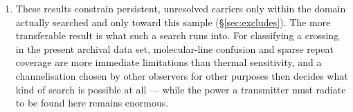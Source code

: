 \begin{enumerate}[leftmargin=1.6em,itemsep=4pt,topsep=4pt,parsep=0pt]
\item These results constrain persistent, unresolved carriers only within
the domain actually searched and only toward this sample
(\S\ref{sec:excludes}). The more transferable result is what such a search
runs into. For classifying a crossing in the present archival data set,
molecular-line confusion and sparse repeat coverage are more immediate
limitations than thermal sensitivity, and a channelisation chosen by other
observers for other purposes then decides what kind of search is possible at
all --- while the power a transmitter must radiate to be found here remains
enormous.

\end{enumerate}
